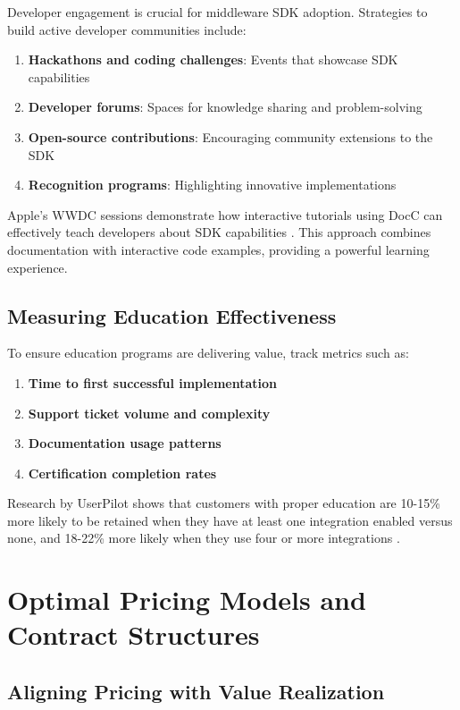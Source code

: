 \documentclass[11pt,a4paper]{article}
\begin{document}
Developer engagement is crucial for middleware SDK adoption. Strategies to build active developer communities include:

\begin{enumerate}
    \item \textbf{Hackathons and coding challenges}: Events that showcase SDK capabilities
    \item \textbf{Developer forums}: Spaces for knowledge sharing and problem-solving
    \item \textbf{Open-source contributions}: Encouraging community extensions to the SDK
    \item \textbf{Recognition programs}: Highlighting innovative implementations
\end{enumerate}

Apple's WWDC sessions demonstrate how interactive tutorials using DocC can effectively teach developers about SDK capabilities \citep{apple2021build}. This approach combines documentation with interactive code examples, providing a powerful learning experience.

\subsection{Measuring Education Effectiveness}

To ensure education programs are delivering value, track metrics such as:

\begin{enumerate}
    \item \textbf{Time to first successful implementation}
    \item \textbf{Support ticket volume and complexity}
    \item \textbf{Documentation usage patterns}
    \item \textbf{Certification completion rates}
\end{enumerate}

Research by UserPilot shows that customers with proper education are 10-15\% more likely to be retained when they have at least one integration enabled versus none, and 18-22\% more likely when they use four or more integrations \citep{Grigoryan2022}.

\section{Optimal Pricing Models and Contract Structures}

\subsection{Aligning Pricing with Value Realization}
\end{document}
